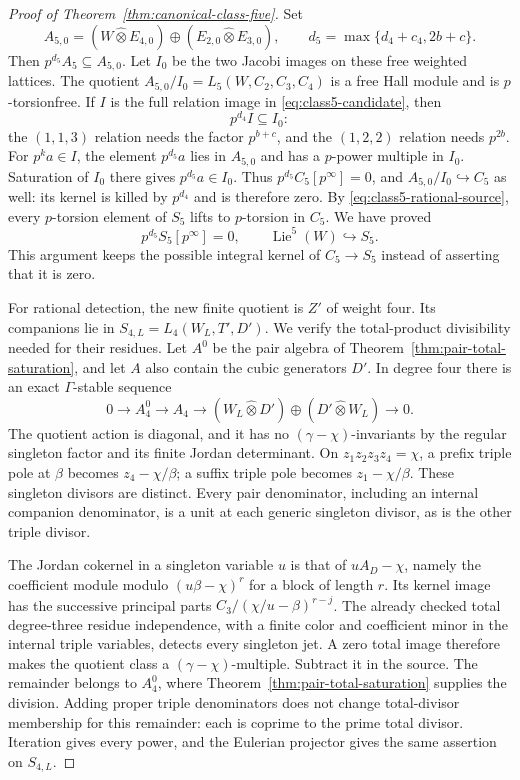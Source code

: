 \begin{proof}[Proof of Theorem~\ref{thm:canonical-class-five}]
Set
\[
 A_{5,0}=(W\widehat\otimes E_{4,0})\oplus
                          (E_{2,0}\widehat\otimes E_{3,0}),
 \qquad d_5=\max\{d_4+c_4,2b+c\}.
\]
Then $p^{d_5}A_5\subseteq A_{5,0}$. Let $I_0$ be the
two Jacobi images on these free weighted lattices.
The quotient $A_{5,0}/I_0=L_5(W,C_2,C_3,C_4)$ is a
free Hall module and is $p$-torsionfree. If $I$ is
the full relation image in \eqref{eq:class5-candidate},
then
\[
                              p^{d_4}I\subseteq I_0:
\]
the $(1,1,3)$ relation needs the factor $p^{b+c}$,
and the $(1,2,2)$ relation needs $p^{2b}$.
For $p^ka\in I$, the element $p^{d_5}a$ lies in
$A_{5,0}$ and has a $p$-power multiple in $I_0$.
Saturation of $I_0$ there gives $p^{d_5}a\in I_0$.
Thus $p^{d_5}C_5[p^\infty]=0$, and
$A_{5,0}/I_0\hookrightarrow C_5$ as well: its kernel
is killed by $p^{d_4}$ and is therefore zero.
By \eqref{eq:class5-rational-source}, every $p$-torsion
element of $S_5$ lifts to $p$-torsion in $C_5$.
We have proved
\begin{equation}\label{eq:class5-pbound}
 p^{d_5}S_5[p^\infty]=0,
 \qquad\operatorname{Lie}^5(W)\hookrightarrow S_5.
\end{equation}
This argument keeps the possible integral kernel of
$C_5\to S_5$ instead of asserting that it is zero.

For rational detection, the new finite quotient is
$Z'$ of weight four. Its companions lie in
$S_{4,L}=L_4(W_L,T',D')$. We verify the total-product
divisibility needed for their residues. Let $A^0$
be the pair algebra of
Theorem~\ref{thm:pair-total-saturation}, and let $A$
also contain the cubic generators $D'$. In degree
four there is an exact $\Gamma$-stable sequence
\[
 0\longrightarrow A^0_4\longrightarrow A_4
 \longrightarrow(W_L\widehat\otimes D')
                    \oplus(D'\widehat\otimes W_L)\longrightarrow0.
\]
The quotient action is diagonal, and it has no
$(\gamma-\chi)$-invariants by the regular singleton
factor and its finite Jordan determinant.
On $z_1z_2z_3z_4=\chi$, a prefix triple pole at $\beta$
becomes $z_4-\chi/\beta$; a suffix triple pole becomes
$z_1-\chi/\beta$. These singleton divisors are distinct.
Every pair denominator, including an internal
companion denominator, is a unit at each generic
singleton divisor, as is the other triple divisor.

The Jordan cokernel in a singleton variable $u$ is
that of $uA_D-\chi$, namely the coefficient module
modulo $(u\beta-\chi)^r$ for a block of length $r$.
Its kernel image has the successive principal parts
$C_3/(\chi/u-\beta)^{r-j}$. The already checked total
degree-three residue independence, with a finite
color and coefficient minor in the internal triple
variables, detects every singleton jet. A zero total
image therefore makes the quotient class a
$(\gamma-\chi)$-multiple. Subtract it in the source.
The remainder belongs to $A^0_4$, where
Theorem~\ref{thm:pair-total-saturation} supplies the
division. Adding proper triple denominators does
not change total-divisor membership for this
remainder: each is coprime to the prime total divisor.
Iteration gives every power, and the Eulerian
projector gives the same assertion on $S_{4,L}$.


\end{proof}
